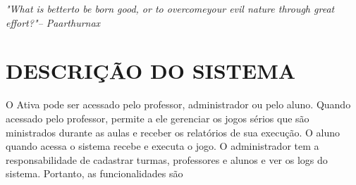 \documentclass{utfpr-pg}
\let\oldlstlistoflistings\lstlistoflistings
\renewcommand{\lstlistoflistings}{%
  \begingroup%
  \let\oldnumberline\numberline%
  \renewcommand{\numberline}{\lstlistingname~\oldnumberline}%
  \oldlstlistoflistings*%
  \endgroup}
\renewcommand{\lstlistingname}{Código}
\begin{document}



\frenchspacing





\imprimircapa
\imprimirfolhaderosto

\cleardoublepage

% 



\begin{epigrafe}
    \vspace*{\fill}
	\begin{flushright}
		\textit{"What is better\smallbreak to be born good, or to overcome\smallbreak  your evil nature through great effort?"\smallbreak -- Paarthurnax}
	\end{flushright}
\end{epigrafe}



\listoffigures
\cleardoublepage







\tableofcontents*
\cleardoublepage

\textual
  \pagestyle{simple}

\chapter{DESCRIÇÃO DO SISTEMA}
  \label{chapter:descsistema}
  O Ativa pode ser acessado pelo professor, administrador ou pelo aluno. Quando acessado pelo professor, permite a ele gerenciar os jogos sérios que são ministrados durante as aulas e receber os relatórios de sua execução. O aluno quando acessa o sistema recebe e executa o jogo. O administrador tem a responsabilidade de cadastrar turmas, professores e alunos e ver os logs do sistema. Portanto, as funcionalidades são \cite{simone2020}
  
  
\end{document}
